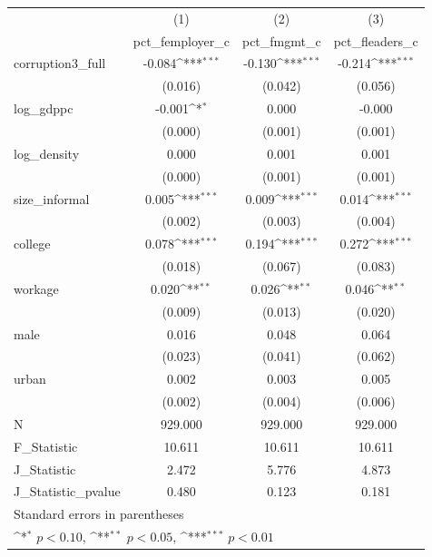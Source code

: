 {
\def\sym#1{\ifmmode^{#1}\else\(^{#1}\)\fi}
\begin{tabular}{l*{3}{c}}
\hline\hline
            &\multicolumn{1}{c}{(1)}&\multicolumn{1}{c}{(2)}&\multicolumn{1}{c}{(3)}\\
            &\multicolumn{1}{c}{pct\_femployer\_c}&\multicolumn{1}{c}{pct\_fmgmt\_c}&\multicolumn{1}{c}{pct\_fleaders\_c}\\
\hline
corruption3\_full&      -0.084\sym{***}&      -0.130\sym{***}&      -0.214\sym{***}\\
            &     (0.016)         &     (0.042)         &     (0.056)         \\
[1em]
log\_gdppc   &      -0.001\sym{*}  &       0.000         &      -0.000         \\
            &     (0.000)         &     (0.001)         &     (0.001)         \\
[1em]
log\_density &       0.000         &       0.001         &       0.001         \\
            &     (0.000)         &     (0.001)         &     (0.001)         \\
[1em]
size\_informal&       0.005\sym{***}&       0.009\sym{***}&       0.014\sym{***}\\
            &     (0.002)         &     (0.003)         &     (0.004)         \\
[1em]
college     &       0.078\sym{***}&       0.194\sym{***}&       0.272\sym{***}\\
            &     (0.018)         &     (0.067)         &     (0.083)         \\
[1em]
workage     &       0.020\sym{**} &       0.026\sym{**} &       0.046\sym{**} \\
            &     (0.009)         &     (0.013)         &     (0.020)         \\
[1em]
male        &       0.016         &       0.048         &       0.064         \\
            &     (0.023)         &     (0.041)         &     (0.062)         \\
[1em]
urban       &       0.002         &       0.003         &       0.005         \\
            &     (0.002)         &     (0.004)         &     (0.006)         \\
\hline
N           &     929.000         &     929.000         &     929.000         \\
F\_Statistic &      10.611         &      10.611         &      10.611         \\
J\_Statistic &       2.472         &       5.776         &       4.873         \\
J\_Statistic\_pvalue&       0.480         &       0.123         &       0.181         \\
\hline\hline
\multicolumn{4}{l}{\footnotesize Standard errors in parentheses}\\
\multicolumn{4}{l}{\footnotesize \sym{*} \(p<0.10\), \sym{**} \(p<0.05\), \sym{***} \(p<0.01\)}\\
\end{tabular}
}
